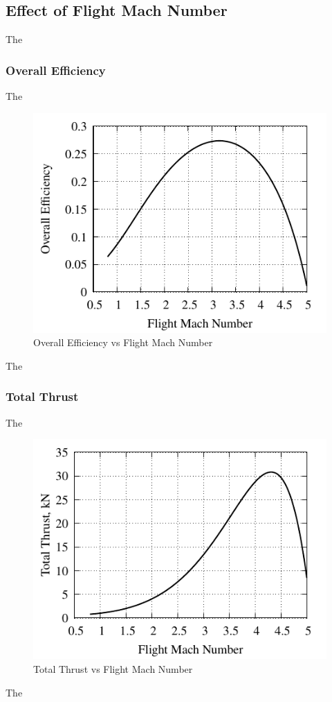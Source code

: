 \documentclass[conf]{new-aiaa} %
\begin{document}
\subsection{Effect of Flight Mach Number} %
The

\subsubsection{Overall Efficiency}
The

\begin{figure}[hbt!] %
    \centering
    \includegraphics[]{media/performance_parameter_files/part_c_eta_o.pdf}
    \caption{\label{fig:partcetao}Overall Efficiency vs Flight Mach Number}
\end{figure}
The

\subsubsection{Total Thrust}
The

\begin{figure}[hbt!] %
    \centering
    \includegraphics[]{media/performance_parameter_files/part_c_T.pdf}
    \caption{\label{fig:partct}Total Thrust vs Flight Mach Number}
\end{figure}
The
\end{document}
